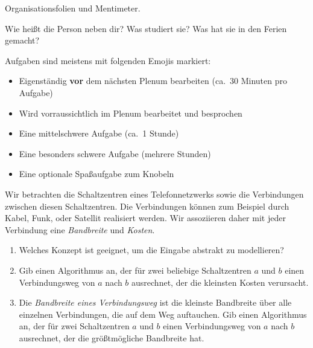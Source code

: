 \documentclass{uebung_cs}
\begin{document}
\begin{exercise}[Kennenlernen I][\atschool]
  Organisationsfolien und Mentimeter.
\end{exercise}

\begin{exercise}[Kennenlernen II][\atschool]
  Wie heißt die Person neben dir?
  Was studiert sie?
  Was hat sie in den Ferien gemacht?
\end{exercise}

\begin{exercise}
  Aufgaben sind meistens mit folgenden Emojis markiert:
  \begin{itemize}
    \item[\athome] Eigenständig \textbf{vor} dem nächsten Plenum bearbeiten (ca.~30 Minuten pro Aufgabe)
    \item[\atschool] Wird vorraussichtlich im Plenum bearbeitet und besprochen
    \item[\mittel] Eine mittelschwere Aufgabe (ca.~1 Stunde)
    \item[\note] Eine besonders schwere Aufgabe (mehrere Stunden)
    \item[\spass] Eine optionale Spaßaufgabe zum Knobeln
  \end{itemize}
\end{exercise}

\begin{exercise}[Telefonnetzwerk][\atschool\mittel]
  Wir betrachten die Schaltzentren eines Telefonnetzwerks sowie die Verbindungen zwischen diesen Schaltzentren.
  Die Verbindungen können zum Beispiel durch Kabel, Funk, oder Satellit realisiert werden.
  Wir assoziieren daher mit jeder Verbindung eine \emph{Bandbreite} und \emph{Kosten}.
  \begin{enumerate}
    \item Welches Konzept ist geeignet, um die Eingabe abstrakt zu modellieren?
    \item Gib einen Algorithmus an, der für zwei beliebige Schaltzentren $a$ und $b$ einen Verbindungsweg von $a$ nach $b$ ausrechnet, der die kleinsten Kosten verursacht.
    \item Die \emph{Bandbreite eines Verbindungsweg} ist die kleinste Bandbreite über alle einzelnen Verbindungen, die auf dem Weg auftauchen.
    Gib einen Algorithmus an, der für zwei Schaltzentren $a$ und $b$ einen Verbindungsweg von $a$ nach $b$ ausrechnet, der die größtmögliche Bandbreite hat.
  \end{enumerate}
\end{exercise}
\end{document}
